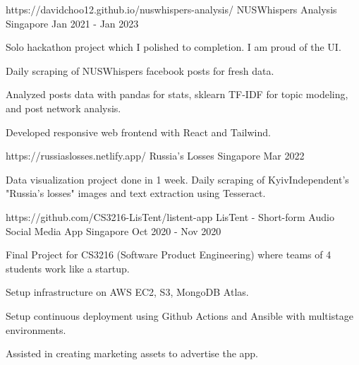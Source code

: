 

\begin{cventries}

  \cventry
    {https://davidchoo12.github.io/nuswhispers-analysis/} %
    {NUSWhispers Analysis} %
    {Singapore} %
    {Jan 2021 - Jan 2023} %
    {
      \begin{cvitems} %
        \item {Solo hackathon project which I polished to completion. I am proud of the UI.}
        \item {Daily scraping of NUSWhispers facebook posts for fresh data.}
        \item {Analyzed posts data with pandas for stats, sklearn TF-IDF for topic modeling, and post network analysis.}
        \item {Developed responsive web frontend with React and Tailwind.}
      \end{cvitems}
    }

  \cventry
    {https://russiaslosses.netlify.app/} %
    {Russia's Losses} %
    {Singapore} %
    {Mar 2022} %
    {
      \begin{cvitems} %
        \item {Data visualization project done in 1 week. Daily scraping of KyivIndependent's "Russia's losses" images and text extraction using Tesseract.}
      \end{cvitems}
    }

  \cventry
    {https://github.com/CS3216-LisTent/listent-app} %
    {LisTent - Short-form Audio Social Media App} %
    {Singapore} %
    {Oct 2020 - Nov 2020} %
    {
      \begin{cvitems} %
        \item {Final Project for CS3216 (Software Product Engineering) where teams of 4 students work like a startup.}
        \item {Setup infrastructure on AWS EC2, S3, MongoDB Atlas.}
        \item {Setup continuous deployment using Github Actions and Ansible with multistage environments.}
        \item {Assisted in creating marketing assets to advertise the app.}
      \end{cvitems}
    }


\end{cventries}
